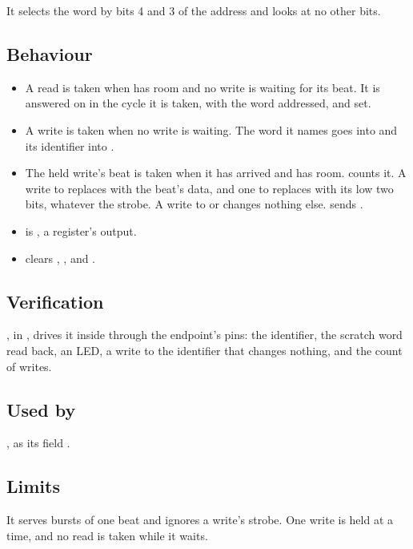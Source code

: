 It selects the word by bits 4 and 3 of the address and looks at no
other bits.


\subsection*{Behaviour}

\begin{itemize}
\item A read is taken when  has room and no write is waiting
for its beat. It is answered on  in the cycle it is taken,
with the word addressed,  and  set.
\item A write is taken when no write is waiting. The word it names goes
into  and its identifier into .
\item The held write's beat is taken when it has arrived and 
has room.  counts it. A write to  replaces
 with the beat's data, and one to  replaces
 with its low two bits, whatever the strobe. A write to
 or  changes nothing else.  sends
.
\item {} is , a register's output.
\item {} clears , ,  and
.
\end{itemize}

\subsection*{Verification}

, in
, drives it inside  through the
endpoint's pins: the identifier, the scratch word read back, an LED,
a write to the identifier that changes nothing, and the count of writes.

\subsection*{Used by}

, as its field .

\subsection*{Limits}

It serves bursts of one beat and ignores a write's strobe. One write is
held at a time, and no read is taken while it waits.
